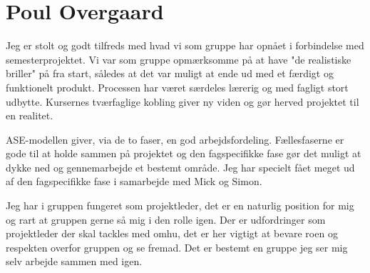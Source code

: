 \section{Poul Overgaard}

Jeg er stolt og godt tilfreds med hvad vi som gruppe har opnået i forbindelse med semesterprojektet. Vi var som gruppe opmærksomme på at have "de realistiske briller" på fra start, således at det var muligt at ende ud med et færdigt og funktionelt produkt.
Processen har været særdeles lærerig og med fagligt stort udbytte. Kursernes tværfaglige kobling giver ny viden og gør herved projektet til en realitet. 

ASE-modellen giver, via de to faser, en god arbejdsfordeling. Fællesfaserne er gode til at holde sammen på projektet og den fagspecifikke fase gør det muligt at dykke ned og gennemarbejde et bestemt område. Jeg har specielt fået meget ud af den fagspecifikke fase i samarbejde med Mick og Simon.  

Jeg har i gruppen fungeret som projektleder, det er en naturlig position for mig og rart at gruppen gerne så mig i den rolle igen. Der er udfordringer som projektleder der skal tackles med omhu, det er her vigtigt at bevare roen og respekten overfor gruppen og se fremad. Det er bestemt en gruppe jeg ser mig selv arbejde sammen med igen. 